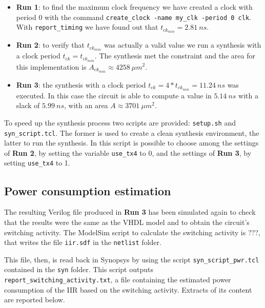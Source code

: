 \begin{itemize}
    \item \textbf{Run 1}: to find the maximum clock frequency we have created a clock with period 0 with the command \verb|create_clock -name my_clk -period 0 clk|. With \verb|report_timing| we have found out that $t_{ck_{min}} = 2.81\ ns$.
    \item \textbf{Run 2}: to verify that $t_{ck_{min}}$ was actually a valid value we run a synthesis with a clock period $t_{ck} = t_{ck_{min}}$. The synthesis met the constraint and the area for this implementation is $A_{ck_{min}} \approx 4258\ \mu m^2$.
    \item \textbf{Run 3}: the synthesis with a clock period $t_{ck} = 4*t_{ck_{min}} = 11.24\ ns$ was executed. In this case the circuit is able to compute a value in $5.14\ ns$ with a slack of $5.99\ ns$, with an area $A \approx 3701\ \mu m^2$. 
\end{itemize}

To speed up the synthesis process two scripts are provided: \verb|setup.sh| and \verb|syn_script.tcl|. The former is used to create a clean synthesis environment,
the latter to run the synthesis. In this script is possible to choose among the settings of \textbf{Run 2}, by setting the variable \verb|use_tx4| to 0, and the settings
of \textbf{Run 3}, by setting \verb|use_tx4| to 1. 

\subsection{Power consumption estimation}

The resulting Verilog file produced in \textbf{Run 3} has been simulated again to check that the results were the same as the VHDL model and to obtain the circuit's switching activity.
The ModelSim script to calculate the switching activity is ???, that writes the file \verb|iir.sdf| in the \verb|netlist| folder.

This file, then, is read back in Synopsys by using the script \verb|syn_script_pwr.tcl| contained in the \verb|syn| folder. This script outputs \verb|report_switching_activity.txt|, a file containing the estimated power
consumption of the IIR based on the switching activity. Extracts of its content are reported below.

